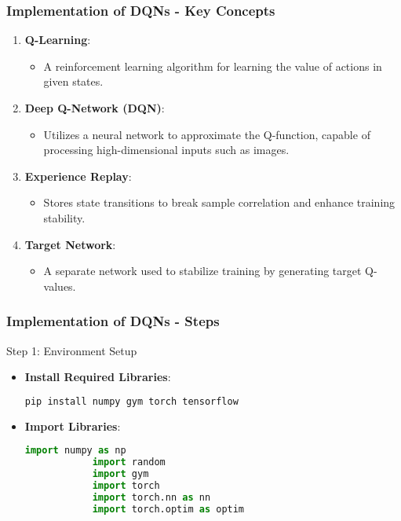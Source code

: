 \documentclass[aspectratio=169]{beamer}
\begin{document}
\begin{frame}[fragile]
    \frametitle{Implementation of DQNs - Key Concepts}
    \begin{enumerate}
        \item \textbf{Q-Learning}:
        \begin{itemize}
            \item A reinforcement learning algorithm for learning the value of actions in given states.
        \end{itemize}
        
        \item \textbf{Deep Q-Network (DQN)}:
        \begin{itemize}
            \item Utilizes a neural network to approximate the Q-function, capable of processing high-dimensional inputs such as images.
        \end{itemize}
        
        \item \textbf{Experience Replay}:
        \begin{itemize}
            \item Stores state transitions to break sample correlation and enhance training stability.
        \end{itemize}
        
        \item \textbf{Target Network}:
        \begin{itemize}
            \item A separate network used to stabilize training by generating target Q-values.
        \end{itemize}
    \end{enumerate}
\end{frame}

\begin{frame}[fragile]
    \frametitle{Implementation of DQNs - Steps}
    \begin{block}{Step 1: Environment Setup}
        \begin{itemize}
            \item \textbf{Install Required Libraries}:
            \begin{lstlisting}[language=bash]
            pip install numpy gym torch tensorflow
            \end{lstlisting}
            
            \item \textbf{Import Libraries}:
            \begin{lstlisting}[language=python]
            import numpy as np
            import random
            import gym
            import torch
            import torch.nn as nn
            import torch.optim as optim
            \end{lstlisting}
        \end{itemize}
    \end{block}
\end{frame}
\end{document}
